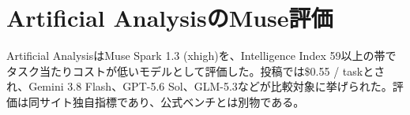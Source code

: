 \section{Artificial AnalysisのMuse評価}
Artificial AnalysisはMuse Spark 1.3 (xhigh)を、Intelligence Index 59以上の帯でタスク当たりコストが低いモデルとして評価した。投稿では\$0.55 / taskとされ、Gemini 3.8 Flash、GPT-5.6 Sol、GLM-5.3などが比較対象に挙げられた。評価は同サイト独自指標であり、公式ベンチとは別物である。
